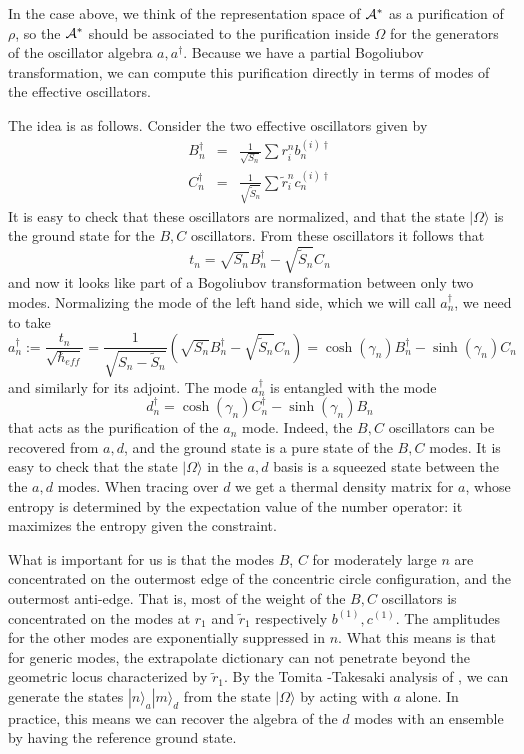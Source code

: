 \documentclass[12pt,nofootinbib, longbibliography]{revtex4-1}
\newcommand\ket[1]{| #1\rangle}
\begin{document}
In the case above, we think of the representation space of ${\cal A}^*$ as a purification of $\rho$, so the ${\cal A}^*$ should be associated to the purification inside $\Omega$ for the generators of the oscillator algebra $a, a^\dagger$. Because we have a partial Bogoliubov transformation, we can compute this purification directly in terms of modes of the effective oscillators.

The idea is as follows.  Consider the two effective oscillators given by
\begin{eqnarray}
B_n^\dagger &=& \frac 1{\sqrt{S_n}}\sum r_i^n b_n^{(i)\dagger}\\
C_n^\dagger&=& \frac 1{\sqrt {\tilde S_n}} \sum \tilde r_i^n c_n^{(i)\dagger}
\end{eqnarray}
It is easy to check that these oscillators are normalized, and that the state $\ket\Omega$ is the ground state for the $B,C$ oscillators. From these oscillators it follows that 
\begin{equation}
t_n = \sqrt {S_n} B_n^\dagger -\sqrt{\tilde S_n} C_n
\end{equation}
and now it looks like part of a Bogoliubov transformation between only two modes. Normalizing the mode of the left hand side, which we will call $a^\dagger_n$, we need to take
\begin{equation}
a_n^\dagger := \frac {t_n}{\sqrt{\hbar_{eff}}} = \frac 1{\sqrt{S_n-\tilde S_n}} (\sqrt {S_n} B_n^\dagger -\sqrt{\tilde S_n} C_n)= \cosh (\gamma_n) B_n^\dagger-\sinh(\gamma_n) C_n
\end{equation}
and similarly for its adjoint.
The mode $a_n^\dagger$ is entangled with the mode
\begin{equation}
d_n^\dagger=\cosh(\gamma_n) C_n^\dagger-\sinh(\gamma_n)B_n
\end{equation}
that acts as the purification of the $a_n$ mode. Indeed, the $B,C$ oscillators can be recovered from $a,d$, and the ground state is a pure state of the $B,C$ modes. It is easy to check that the state $\ket \Omega$ in the $a,d$ basis is a squeezed state between the the $a,d$ modes. When tracing over $d$ we get a thermal density matrix for $a$, whose entropy is determined by the expectation value of the number operator: it maximizes the entropy given the constraint.

What is important for us is that the modes $B$, $C$ for moderately large $n$ are concentrated on the outermost edge of the concentric circle configuration, and the outermost anti-edge.
That is, most of the weight of the $B,C$ oscillators is concentrated on the modes at $r_1$ and $\tilde r_1$ respectively $b^{(1)},c^{(1)}$. The amplitudes for the other modes are exponentially suppressed in $n$. What this means is that for generic modes, the extrapolate dictionary can not penetrate beyond the geometric locus characterized by $\tilde  r_1$. By the Tomita -Takesaki analysis of \cite{Papadodimas:2013jku}, we can generate the states 
$\ket n _a\ket m_d$ from the state $\ket \Omega$ by acting with $a$ alone. In practice, this means we can recover the  algebra of the $d$ modes with an ensemble by having the reference ground state. 
\end{document}
